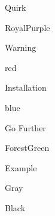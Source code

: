 \usepackage{tcolorbox}

\newcommand{\defprop}[3]{
  \expandafter\def\csname @val@#1@#2\endcsname{#3}
}

\newcommand{\getprop}[2]{%
  \ifcsname @val@#1@#2\endcsname%
  \csname @val@#1@#2\endcsname%
  \fi
}

\newcommand{\defbox}[3]{
  \defprop{#1}{title}{#2}
  \defprop{#1}{color}{#3}
}

\defbox{quirk}{Quirk}{RoyalPurple}
\defbox{warning}{Warning}{red}
\defbox{installation}{Installation}{blue}
\defbox{further}{Go Further}{ForestGreen}
\defbox{example}{Example}{Gray}
\defbox{notcode}{}{Black}

\newenvironment{bookblock}[1]{
  \ifcsname @val@#1@color\endcsname
  \begin{tcolorbox}[colback=\getprop{#1}{color}!5!white,
                    colframe=\getprop{#1}{color}!75!white,
                    title={\getprop{#1}{title}}]
  \else
  \PackageError{bookblock}{Unknown book block '#1'}{}
  \fi
}{
\end{tcolorbox}
}

\newenvironment{bookblock*}[1]{
  \ifcsname @val@#1@color\endcsname
  \begin{tcolorbox}[colback=\getprop{#1}{color}!5!white,
                    colframe=\getprop{#1}{color}!75!white]
  \else
  \PackageError{bookblock}{Unknown book block '#1'}{}
  \fi
}{
\end{tcolorbox}
}

